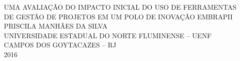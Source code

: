 \begin{titlepage}
 \begin{center}
   {\large UMA AVALIAÇÃO DO IMPACTO INICIAL DO USO DE FERRAMENTAS DE GESTÃO DE PROJETOS EM UM POLO DE INOVAÇÃO EMBRAPII} \\ [7cm]
   {\large PRISCILA MANHÃES DA SILVA} \\ [4cm]
   \vfill
   {\large UNIVERSIDADE ESTADUAL DO NORTE FLUMINENSE – UENF} \\ [1cm]
   {\large CAMPOS DOS GOYTACAZES – RJ} \\
   {\large 2016}
 \end{center}
\end{titlepage}
